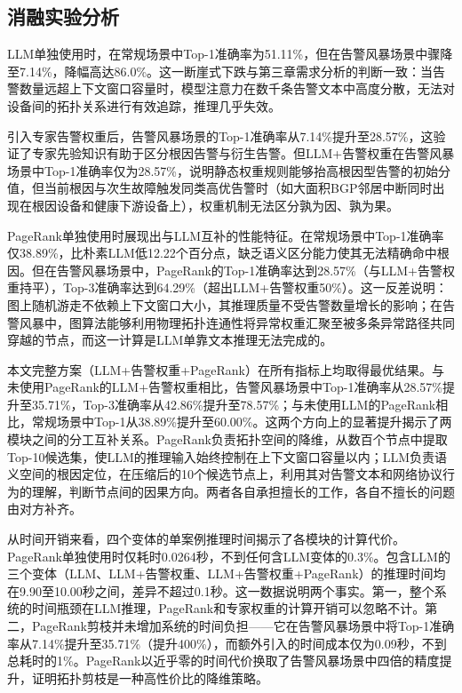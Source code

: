 \subsection{消融实验分析}

LLM单独使用时，在常规场景中Top-1准确率为51.11\%，但在告警风暴场景中骤降至7.14\%，降幅高达86.0\%。这一断崖式下跌与第三章需求分析的判断一致：当告警数量远超上下文窗口容量时，模型注意力在数千条告警文本中高度分散，无法对设备间的拓扑关系进行有效追踪，推理几乎失效。

引入专家告警权重后，告警风暴场景的Top-1准确率从7.14\%提升至28.57\%，这验证了专家先验知识有助于区分根因告警与衍生告警。但LLM+告警权重在告警风暴场景中Top-1准确率仅为28.57\%，说明静态权重规则能够抬高根因型告警的初始分值，但当前根因与次生故障触发同类高优告警时（如大面积BGP邻居中断同时出现在根因设备和健康下游设备上），权重机制无法区分孰为因、孰为果。

PageRank单独使用时展现出与LLM互补的性能特征。在常规场景中Top-1准确率仅38.89\%，比朴素LLM低12.22个百分点，缺乏语义区分能力使其无法精确命中根因。但在告警风暴场景中，PageRank的Top-1准确率达到28.57\%（与LLM+告警权重持平），Top-3准确率达到64.29\%（超出LLM+告警权重50\%）。这一反差说明：图上随机游走不依赖上下文窗口大小，其推理质量不受告警数量增长的影响；在告警风暴中，图算法能够利用物理拓扑连通性将异常权重汇聚至被多条异常路径共同穿越的节点，而这一计算是LLM单靠文本推理无法完成的。

本文完整方案（LLM+告警权重+PageRank）在所有指标上均取得最优结果。与未使用PageRank的LLM+告警权重相比，告警风暴场景中Top-1准确率从28.57\%提升至35.71\%，Top-3准确率从42.86\%提升至78.57\%；与未使用LLM的PageRank相比，常规场景中Top-1从38.89\%提升至60.00\%。这两个方向上的显著提升揭示了两模块之间的分工互补关系。PageRank负责拓扑空间的降维，从数百个节点中提取Top-10候选集，使LLM的推理输入始终控制在上下文窗口容量以内；LLM负责语义空间的根因定位，在压缩后的10个候选节点上，利用其对告警文本和网络协议行为的理解，判断节点间的因果方向。两者各自承担擅长的工作，各自不擅长的问题由对方补齐。

从时间开销来看，四个变体的单案例推理时间揭示了各模块的计算代价。PageRank单独使用时仅耗时0.0264秒，不到任何含LLM变体的0.3\%。包含LLM的三个变体（LLM、LLM+告警权重、LLM+告警权重+PageRank）的推理时间均在9.90至10.00秒之间，差异不超过0.1秒。这一数据说明两个事实。第一，整个系统的时间瓶颈在LLM推理，PageRank和专家权重的计算开销可以忽略不计。第二，PageRank剪枝并未增加系统的时间负担——它在告警风暴场景中将Top-1准确率从7.14\%提升至35.71\%（提升400\%），而额外引入的时间成本仅为0.09秒，不到总耗时的1\%。PageRank以近乎零的时间代价换取了告警风暴场景中四倍的精度提升，证明拓扑剪枝是一种高性价比的降维策略。

